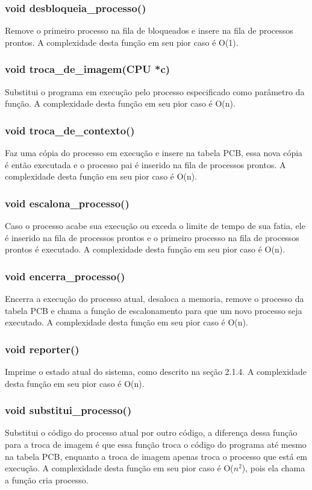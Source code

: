 \documentclass[a4paper, 12pt]{article}
\begin{document}
 \subsubsection{void desbloqueia\_processo()}
    Remove o primeiro processo na fila de bloqueados e insere na fila de processos prontos. A complexidade desta função em seu pior caso é O(1).
    
 \subsubsection{void troca\_de\_imagem(CPU *c)}
    Substitui o programa em execução pelo processo especificado como parâmetro da função. A complexidade desta função em seu pior caso é O(n).
 
 \subsubsection{void troca\_de\_contexto()}
    Faz uma cópia do processo em execução e insere na tabela PCB, essa nova cópia é então executada e o processo pai é inserido na fila de processos prontos. A complexidade desta função em seu pior caso é O(n).
    
 \subsubsection{void escalona\_processo()}
    Caso o processo acabe sua execução ou exceda o limite de tempo de sua fatia, ele é inserido na fila de processos prontos e o primeiro processo na fila de processos prontos é executado. A complexidade desta função em seu pior caso é O(n).
    
 \subsubsection{void encerra\_processo()}
    Encerra a execução do processo atual, desaloca a memoria, remove o processo da tabela PCB e chama a função de escalonamento para que um novo processo seja executado. A complexidade desta função em seu pior caso é O(n).
    
 \subsubsection{void reporter()}
    Imprime o estado atual do sistema, como descrito na seção 2.1.4. A complexidade desta função em seu pior caso é O(n).
    
 \subsubsection{void substitui\_processo()}
    Substitui o código do processo atual por outro código, a diferença dessa função para a troca de imagem é que essa função troca o código do programa até mesmo na tabela PCB, enquanto a troca de imagem apenas troca o processo que está em execução. A complexidade desta função em seu pior caso é O($n^2$), pois ela chama a função cria processo.
    
\end{document}
